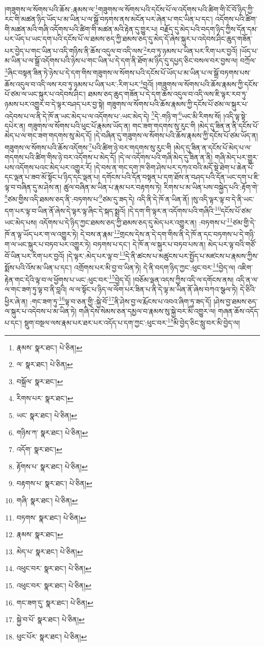 །གཟུགས་ལ་སོགས་པའི་ཆོས་:རྣམས་ལ་\footnote{རྣམས་  སྣར་ཐང་།  པེ་ཅིན། }གཟུགས་ལ་སོགས་པའི་དངོས་པོ་ལ་འདོགས་པའི་ཚིག་གི་ངོ་བོ་ཉིད་ཀྱི་རང་གི་མཚན་ཉིད་ཡོད་པ་མ་ཡིན་པ་ལ་སྒྲོ་བཏགས་ནས་མངོན་པར་ཞེན་པ་གང་ཡིན་པ་དང་། འདོགས་པའི་ཚིག་གི་མཚན་མའི་གཞི་འདོགས་པའི་ཚིག་གི་མཚན་མའི་རྟེན་དུ་གྱུར་པ། བརྗོད་དུ་མེད་པའི་བདག་ཉིད་ཀྱིས་དོན་དམ་པར་ཡོད་པ་ཡང་དག་པའི་དངོས་པོ་ལ་ཐམས་ཅད་ཀྱི་ཐམས་ཅད་དུ་མེད་དོ་ཞེས་སྐུར་པ་འདེབས་ཤིང་ཆུད་གཟོན་པར་བྱེད་པ་གང་ཡིན་པ་འདི་གཉིས་ནི་ཆོས་འདུལ་བ་འདི་ལས་\footnote{ལ་  སྣར་ཐང་།  པེ་ཅིན། }རབ་ཏུ་ཉམས་པ་ཡིན་པར་རིག་པར་བྱའོ། །ཡོད་པ་མ་ཡིན་པ་ལ་སྒྲོ་འདོགས་པའི་ཉེས་པ་གང་ཡིན་པ་དེ་དག་ནི་ཐོག་མ་ཉིད་དུ་དཔྱད་ཅིང་བསལ་བར་བྱས་ལ། བཀྲོལ་\footnote{བསྐྲོལ་  སྣར་ཐང་། }ཞིང་བསྟན་ཟིན་ཏེ་ཉེས་པ་དེ་དག་གིས་གཟུགས་ལ་སོགས་པའི་དངོས་པོ་ཡོད་པ་མ་ཡིན་པ་ལ་སྒྲོ་བཏགས་པས་ཆོས་འདུལ་བ་འདི་ལས་རབ་ཏུ་ཉམས་པ་ཡིན་པར་:རིག་པར་\footnote{རིགས་པར་  སྣར་ཐང་། }བྱའོ། །གཟུགས་ལ་སོགས་པའི་ཆོས་རྣམས་ཀྱི་དངོས་པོ་ཙམ་ལ་ཡང་སྐུར་པ་འདེབས་ཤིང་། ཐམས་ཅད་ཆུད་གཟོན་པ་དེ་དག་ཆོས་འདུལ་བ་འདི་ལས་ཇི་ལྟར་རབ་ཏུ་ཉམས་པར་འགྱུར་བ་དེ་ལྟར་བཤད་པར་བྱ་སྟེ། གཟུགས་ལ་སོགས་པའི་ཆོས་རྣམས་ཀྱི་དངོས་པོ་ཙམ་ལ་སྐུར་པ་འདེབས་པ་ལ་ནི་དེ་ཁོ་ན་ཡང་མེད་པ་ལ་འདོགས་པ་:ཡང་མེད་དེ། \footnote{ཡང་  སྣར་ཐང་།  པེ་ཅིན། }དེ་:གཉི་ག་\footnote{གཉིས་ཀ་  སྣར་ཐང་།  པེ་ཅིན། }ཡང་མི་རིགས་སོ། །འདི་ལྟ་སྟེ་དཔེར་ན། གཟུགས་ལ་སོགས་པའི་ཕུང་པོ་རྣམས་ཡོད་ན། གང་ཟག་གདགས་སུ་རུང་གི །མེད་དུ་ཟིན་ན་ནི་དངོས་པོ་མེད་པ་ལ་གང་ཟག་གདགས་སུ་མེད་དོ། །དེ་བཞིན་དུ་གཟུགས་ལ་སོགས་པའི་ཆོས་རྣམས་ཀྱི་དངོས་པོ་ཙམ་ཡོད་ན། གཟུགས་ལ་སོགས་པའི་ཆོས་འདོགས་\footnote{འདོག་  སྣར་ཐང་། }པའི་ཚིག་ཉེ་བར་གདགས་སུ་རུང་གི །མེད་དུ་ཟིན་ན་དངོས་པོ་མེད་པ་ལ་གདགས་པའི་ཚིག་གིས་ཉེ་བར་འདོགས་པ་མེད་དོ། །དེ་ལ་འདོགས་པའི་གཞི་མེད་དུ་ཟིན་ན་ནི། གཞི་མེད་པར་གྱུར་པས་འདོགས་པའང་མེད་པར་འགྱུར་རོ། །དེ་བས་ན་གང་དག་ཁ་ཅིག་ཤེས་པར་དཀའ་བའི་མདོ་སྡེ་ཐེག་པ་ཆེན་པོ་དང་ལྡན་པ་ཟབ་མོ་སྟོང་པ་ཉིད་དང་ལྡན་པ། དགོངས་པའི་དོན་བསྟན་པ་དག་ཐོས་ན་བཤད་པའི་དོན་ཡང་དག་པ་ཇི་ལྟ་བ་བཞིན་དུ་མ་ཤེས་ན། ཚུལ་བཞིན་མ་ཡིན་པ་རྣམ་པར་བརྟགས་ཏེ། རིགས་པ་མ་ཡིན་པས་བསྐྱེད་པའི་:རྟོག་གེ་\footnote{རྟོགས་པ་  སྣར་ཐང་།  པེ་ཅིན། }ཙམ་གྱིས་འདི་ཐམས་ཅད་ནི་:བཏགས་པ་\footnote{བརྟགས་པ་  སྣར་ཐང་།  པེ་ཅིན། }ཙམ་དུ་ཟད་དེ། འདི་ནི་དེ་ཁོ་ན་ཡིན་ནོ། །སུ་འདི་ལྟར་ལྟ་བ་དེ་ནི་ཡང་དག་པར་ལྟ་བ་ཡིན་ནོ་ཞེས་དེ་ལྟར་ལྟ་ཞིང་དེ་སྐད་སྨྲའོ། །དེ་དག་གི་ལྟར་ན་འདོགས་པའི་གཞིའི་\footnote{གཞི་  སྣར་ཐང་།  པེ་ཅིན། }དངོས་པོ་ཙམ་ཡང་མེད་པས། འདོགས་པ་དེ་ཉིད་ཀྱང་ཐམས་ཅད་ཀྱི་ཐམས་ཅད་དུ་མེད་པར་འགྱུར་ན། :བཏགས་པ་\footnote{བཏགས་  སྣར་ཐང་།  པེ་ཅིན། }ཙམ་གྱི་དེ་ཁོ་ན་ལྟ་ཡོད་པར་ག་ལ་འགྱུར་ཏེ། དེ་བས་ན་རྣམ་\footnote{རྣམས་  སྣར་ཐང་། }གྲངས་དེས་ན་དེ་དག་གིས་ནི་དེ་ཁོ་ན་དང་བཏགས་པ་དེ་གཉི་ག་ལ་ཡང་སྐུར་པ་བཏབ་པར་འགྱུར་ཏེ། བཏགས་པ་དང་། དེ་ཁོ་ན་ལ་སྐུར་པ་བཏབ་པས་ན། མེད་པར་ལྟ་བའི་གཙོ་བོ་ཡིན་པར་རིག་པར་བྱའོ། །དེ་ལྟར་:མེད་པར་ལྟ་བ་\footnote{མེད་པ་  སྣར་ཐང་།  པེ་ཅིན། }དེ་ནི་ཚངས་པ་མཚུངས་པར་སྤྱོད་པ་མཛངས་པ་རྣམས་ཀྱིས་སྨོས་པའི་འོས་མ་ཡིན་པ་དང་། འགྲོགས་པར་མི་བྱ་བ་ཡིན་ཏེ། དེ་ནི་བདག་ཉིད་ཀྱང་:ཕུང་བར་\footnote{འཕུང་བར་  སྣར་ཐང་།  པེ་ཅིན། }བྱེད་ལ། འཇིག་རྟེན་གང་དེའི་ལྟ་བ་ལ་ཕྱོགས་པ་ཡང་:ཕུང་བར་\footnote{འཕུང་བར་  སྣར་ཐང་།  པེ་ཅིན། }བྱེད་དོ། །བཅོམ་ལྡན་འདས་ཀྱིས་འདི་ལ་དགོངས་ནས། འདི་ན་ལ་ལ་གང་ཟག་ཏུ་ལྟ་བ་ནི་བླའི། ལ་ལ་སྟོང་པ་ཉིད་ལ་ལོག་པར་ཟིན་པ་ནི་དེ་ལྟ་མ་ཡིན་ནོ་ཞེས་བཀའ་སྩལ་ཏེ། དེ་ཅིའི་ཕྱིར་ཞེ་ན། :གང་ཟག་ཏུ་\footnote{གང་ཟག་དུ་  སྣར་ཐང་།  པེ་ཅིན། }ལྟ་བ་ཅན་གྱི་:སྐྱེ་བོ་\footnote{སྐྱེ་བ་པོ་  སྣར་ཐང་།  པེ་ཅིན། }ནི་ཤེས་བྱ་ལ་རྨོངས་པ་འབའ་ཞིག་ཏུ་ཟད་དོ། །ཤེས་བྱ་ཐམས་ཅད་ལ་སྐུར་པ་འདེབས་པ་མ་ཡིན་ཏེ། གཞི་དེས་སེམས་ཅན་དམྱལ་བ་རྣམས་སུ་སྐྱེ་བར་མི་འགྱུར་ལ། གཞན་ཆོས་འདོད་པ་དང་། སྡུག་བསྔལ་ལས་རྣམ་པར་ཐར་པར་འདོད་པ་དག་ཀྱང་:ཕུང་བར་\footnote{ཕུང་པོར་  སྣར་ཐང་།  པེ་ཅིན། }མི་བྱེད་ཅིང་སླུ་བར་མི་བྱེད་ལ། 